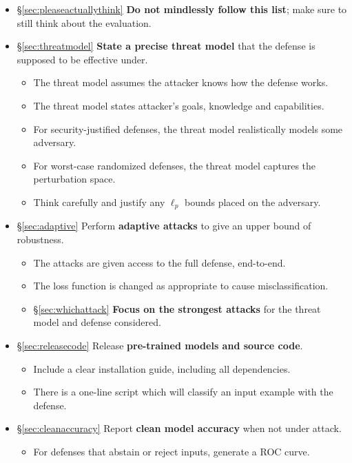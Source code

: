 \documentclass{article} %
\begin{document}
\begin{itemize}[leftmargin=*]
  \item \S\ref{sec:pleaseactuallythink} \textbf{Do not mindlessly follow this list}; make sure to still think about the evaluation.
\item \S\ref{sec:threatmodel} \textbf{State a precise threat model} that the defense is supposed to be effective under.
  \begin{itemize}[leftmargin=*]
  \item The threat model assumes the attacker knows how the defense works.
  \item The threat model states attacker's goals, knowledge and capabilities.
  \item For security-justified defenses, the threat model realistically models some adversary.
  \item For worst-case randomized defenses, the threat model captures the perturbation space.
  \item Think carefully and justify any $\ell_p$ bounds placed on the adversary.
  \end{itemize}
\item \S\ref{sec:adaptive} Perform \textbf{adaptive attacks} to give an upper bound of robustness.
  \begin{itemize}[leftmargin=*]
  \item The attacks are given access to the full defense, end-to-end.
  \item The loss function is changed as appropriate to cause misclassification.
  \item \S\ref{sec:whichattack} \textbf{Focus on the strongest attacks} for the threat model and defense considered.
  \end{itemize}
\item \S\ref{sec:releasecode} Release \textbf{pre-trained models and source code}.
  \begin{itemize}[leftmargin=*]
  \item Include a clear installation guide, including all dependencies.
  \item There is a one-line script which will classify an input example with the defense.
  \end{itemize}
\item \S\ref{sec:cleanaccuracy} Report \textbf{clean model accuracy} when not under attack.
  \begin{itemize}[leftmargin=*]
  \item For defenses that abstain or reject inputs, generate a ROC curve.

\end{itemize}
\end{itemize}
\end{document}
